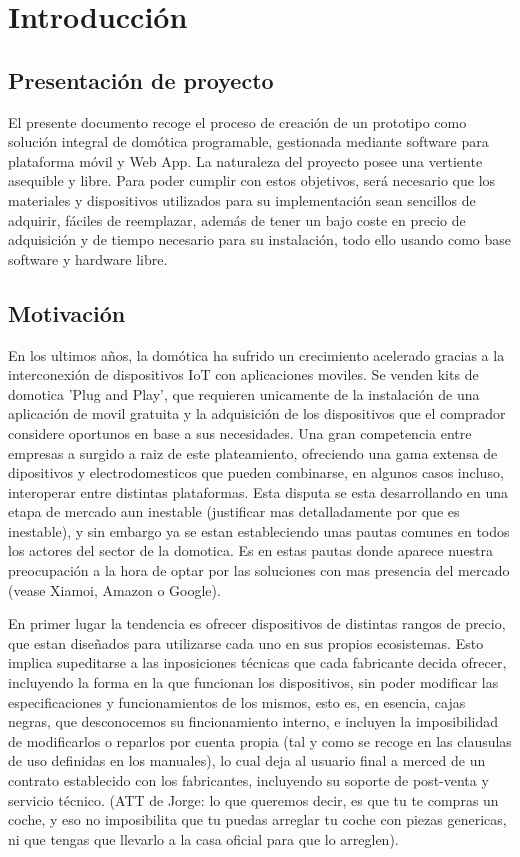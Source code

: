 \cleardoublepage

\chapter{Introducción}

\section{Presentación de proyecto}
\label{ch:Capitulo1}
El presente documento recoge el proceso de creación de un prototipo como solución integral de domótica programable, gestionada mediante software para plataforma móvil y Web App. La naturaleza del proyecto posee una vertiente asequible y libre. Para poder cumplir con estos objetivos, será necesario que los materiales y dispositivos utilizados para su implementación sean sencillos de adquirir, fáciles de reemplazar, además de tener un bajo coste en precio de adquisición y de tiempo necesario para su instalación, todo ello usando como base software y hardware libre.

\section{Motivación}
\label{ch:Capitulo1.1}

En los ultimos años, la domótica ha sufrido un crecimiento acelerado gracias a la interconexión de dispositivos IoT con aplicaciones moviles. Se venden kits de domotica 'Plug and Play', que requieren unicamente de la instalación de una aplicación de movil gratuita y la adquisición de los dispositivos que el comprador considere oportunos en base a sus necesidades. Una gran competencia entre empresas a surgido a raiz de este plateamiento, ofreciendo una gama extensa de dipositivos y electrodomesticos que pueden combinarse, en algunos casos incluso, interoperar entre distintas plataformas. Esta disputa se esta desarrollando en una etapa de mercado aun inestable (justificar mas detalladamente por que es inestable), y sin embargo ya se estan estableciendo unas pautas comunes en todos los actores del sector de la domotica. Es en estas pautas donde aparece nuestra preocupación a la hora de optar por las soluciones con mas presencia del mercado (vease Xiamoi, Amazon o Google).

En primer lugar la tendencia es ofrecer dispositivos de distintas rangos de precio, que estan diseñados para utilizarse cada uno en sus propios ecosistemas. Esto implica supeditarse a las inposiciones técnicas que cada fabricante decida ofrecer, incluyendo la forma en la que funcionan los dispositivos, sin poder modificar las especificaciones y funcionamientos de los mismos, esto es, en esencia, cajas negras, que desconocemos su fincionamiento interno, e incluyen la imposibilidad de modificarlos o reparlos por cuenta propia (tal y como se recoge en las clausulas de uso definidas en los manuales), lo cual deja al usuario final a merced de un contrato establecido con los fabricantes, incluyendo su soporte de post-venta y servicio técnico. (ATT de Jorge: lo que queremos decir, es que tu te compras un coche, y eso no imposibilita que tu puedas arreglar tu coche con piezas genericas, ni que tengas que llevarlo a la casa oficial para que lo arreglen).

